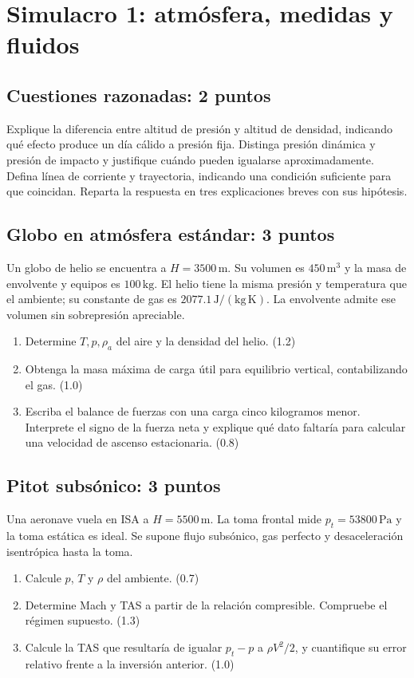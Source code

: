 \chapter{Simulacro 1: atmósfera, medidas y fluidos}
\section{Cuestiones razonadas: 2 puntos}
Explique la diferencia entre altitud de presión y altitud de densidad, indicando qué efecto produce un día cálido a presión fija. Distinga presión dinámica y presión de impacto y justifique cuándo pueden igualarse aproximadamente. Defina línea de corriente y trayectoria, indicando una condición suficiente para que coincidan. Reparta la respuesta en tres explicaciones breves con sus hipótesis.
\section{Globo en atmósfera estándar: 3 puntos}
Un globo de helio se encuentra a $H=3500\,\mathrm m$. Su volumen es $450\,\mathrm{m^3}$ y la masa de envolvente y equipos es $100\,\mathrm{kg}$. El helio tiene la misma presión y temperatura que el ambiente; su constante de gas es $2077.1\,\mathrm{J/(kg\,K)}$. La envolvente admite ese volumen sin sobrepresión apreciable.
\begin{enumerate}[label=\alph*)]
\item Determine $T,p,\rho_a$ del aire y la densidad del helio. (1.2)
\item Obtenga la masa máxima de carga útil para equilibrio vertical, contabilizando el gas. (1.0)
\item Escriba el balance de fuerzas con una carga cinco kilogramos menor. Interprete el signo de la fuerza neta y explique qué dato faltaría para calcular una velocidad de ascenso estacionaria. (0.8)
\end{enumerate}
\section{Pitot subsónico: 3 puntos}
Una aeronave vuela en ISA a $H=5500\,\mathrm m$. La toma frontal mide $p_t=53800\,\mathrm{Pa}$ y la toma estática es ideal. Se supone flujo subsónico, gas perfecto y desaceleración isentrópica hasta la toma.
\begin{enumerate}[label=\alph*)]
\item Calcule $p$, $T$ y $\rho$ del ambiente. (0.7)
\item Determine Mach y TAS a partir de la relación compresible. Compruebe el régimen supuesto. (1.3)
\item Calcule la TAS que resultaría de igualar $p_t-p$ a $\rho V^2/2$, y cuantifique su error relativo frente a la inversión anterior. (1.0)
\end{enumerate}
